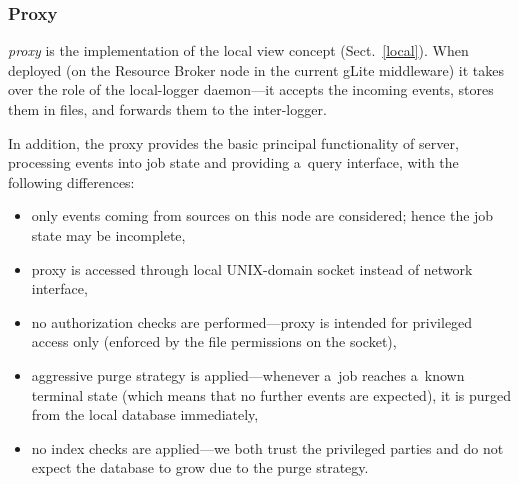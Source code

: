 
\subsubsection{Proxy}
\emph{\LB proxy} is the implementation of the local view concept
(Sect.~\ref{local}).
When deployed (on the Resource Broker node in the current gLite middleware) 
it takes over the role of the local-logger daemon---it accepts the incoming
events, stores them in files, and forwards them to the inter-logger.

In addition, the proxy provides the basic principal functionality of \LB server,
\ie processing events into job state and providing a~query interface,
with the following differences:
\begin{itemize}
\item only events coming from sources on this node are considered; hence
the job state may be incomplete,
\item proxy is accessed through local UNIX-domain socket instead of network
interface,
\item no authorization checks are performed---proxy is intended for
privileged access only (enforced by the file permissions on the socket),
\item aggressive purge strategy is applied---whenever a~job reaches
a~known terminal state (which means that no further events are expected), it is purged
from the local database immediately,
\item no index checks are applied---we both trust the privileged parties
and do not expect the database to grow due to the purge strategy.
\end{itemize}

